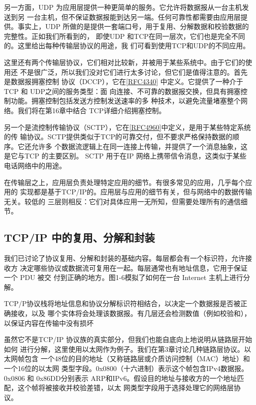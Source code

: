 另一方面，UDP 为应用层提供一种更简单的服务。它允许将数据报从一台主机发送到另
一台主机，但不保证数据报能到达另一端。任何可靠性都需要由应用层提供。事实上，UDP
所做的是提供一套端口号，用于复用、分解数据和校验数据的完整性。正如我们所看到的，
即使UDP 和TCP在同一层次，它们也是完全不同的。这里给出每种传输层协议的用途，我
们可看到使用TCP和UDP的不同应用。

这里还有两个传输层协议，它们相对比较新，并被用于某些系统中。由于它们的使用还
不是很广泛，所以我们没对它们进行太多讨论，但它们是值得注意的。首先是数据报拥塞控制
协议（DCCP），它在\href{https://www.rfc-editor.org/rfc/rfc4340}{[RFC4340]} 中定义。它提供了一种介于TCP 和 UDP之间的服务类型：面
向连接、不可靠的数据报交换，但具有拥塞控制功能。拥塞控制包括发送方控制发送速率的多
种技术，以避免流量堵塞整个网络。我们将在第16章中结合 TCP详细介绍拥塞控制。

另一个是流控制传输协议（SCTP），它在\href{https://www.rfc-editor.org/rfc/rfc4960}{[RFC4960]}中定义，是用于某些特定系统的传
输协议。SCTP提供类似于TCP的可靠交付，但不要求严格保持数据的顺序。它还允许多
个数据流逻辑上在同一连接上传输，并提供了一个消息抽象，这是它与TCP 的主要区别。
SCTP 用于在IP 网络上携带信令消息，这类似于某些电话网络中的用途。

在传输层之上，应用层负责处理特定应用的细节。有很多常见的应用，几乎每个应用的
实现都是基于TCP/IP的。应用层与应用的细节有关，但与网络中的数据传输无关。较低的
三层则相反：它们对具体应用一无所知，但需要处理所有的通信细节。

\subsection{TCP/IP 中的复用、分解和封装}
我们已讨论了协议复用、分解和封装的基础内容。每层都会有一个标识符，允许接收方
决定哪些协议或数据流可复用在一起。每层通常也有地址信息，它用于保证一个 PDU 被交
付到正确的地方。图1-6模拟了如何在一台 Internet 主机上进行分解。

TCP/P协议栈将地址信息和协议分解标识符相结合，以决定一个数据报是否被正确接收，以及
哪个实体将会处理该数据报。有几层还会检测数值（例如校验和），以保证内容在传输中没有损坏

虽然它不是TCP/IP 协议族的真实部分，但我们也能自底向上地说明从链路层开始如何
进行分解，这里使用以太网作为例子。我们在第3章讨论几种链路层协议。以太网帧包含
一个48位的目的地址（又称链路层或介质访问控制（MAC）地址）和一个16位的以太网
类型字段。0x0800（十六进制）表示这个帧包含IPv4数据报。0x0806 和 0x86DD分别表示
ARP和IPv6。假设目的地址与接收方的一个地址匹配，这个帧将被接收并校验差错，以太
网类型字段用于选择处理它的网络层协议。

